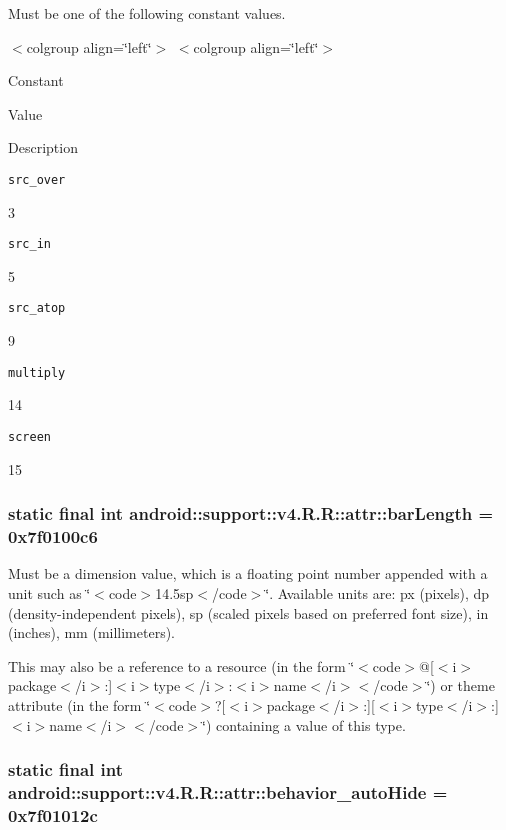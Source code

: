 Must be one of the following constant values. \begin{TabularC}{0}
\hline
\end{TabularC}
$<$colgroup align=\char`\"{}left\char`\"{}$>$ $<$colgroup align=\char`\"{}left\char`\"{}$>$ 

Constant

Value

Description 

{\tt src\_\-over}

3

{\tt src\_\-in}

5

{\tt src\_\-atop}

9

{\tt multiply}

14

{\tt screen}

15\hypertarget{classandroid_1_1support_1_1v4_1_1_r_1_1attr_9a1758cb9a6bcf18ab9ab3a33161d0b8}{
\subsubsection[{barLength}]{\setlength{\rightskip}{0pt plus 5cm}static final int android::support::v4.R.R::attr::barLength = 0x7f0100c6}}
\label{classandroid_1_1support_1_1v4_1_1_r_1_1attr_9a1758cb9a6bcf18ab9ab3a33161d0b8}


Must be a dimension value, which is a floating point number appended with a unit such as \char`\"{}$<$code$>$14.5sp$<$/code$>$\char`\"{}. Available units are: px (pixels), dp (density-independent pixels), sp (scaled pixels based on preferred font size), in (inches), mm (millimeters). 

This may also be a reference to a resource (in the form \char`\"{}$<$code$>$@\mbox{[}$<$i$>$package$<$/i$>$:\mbox{]}$<$i$>$type$<$/i$>$:$<$i$>$name$<$/i$>$$<$/code$>$\char`\"{}) or theme attribute (in the form \char`\"{}$<$code$>$?\mbox{[}$<$i$>$package$<$/i$>$:\mbox{]}\mbox{[}$<$i$>$type$<$/i$>$:\mbox{]}$<$i$>$name$<$/i$>$$<$/code$>$\char`\"{}) containing a value of this type. \hypertarget{classandroid_1_1support_1_1v4_1_1_r_1_1attr_5d80f4332c900bc4402514d2005494a3}{
\subsubsection[{behavior\_\-autoHide}]{\setlength{\rightskip}{0pt plus 5cm}static final int android::support::v4.R.R::attr::behavior\_\-autoHide = 0x7f01012c}}
\label{classandroid_1_1support_1_1v4_1_1_r_1_1attr_5d80f4332c900bc4402514d2005494a3}


